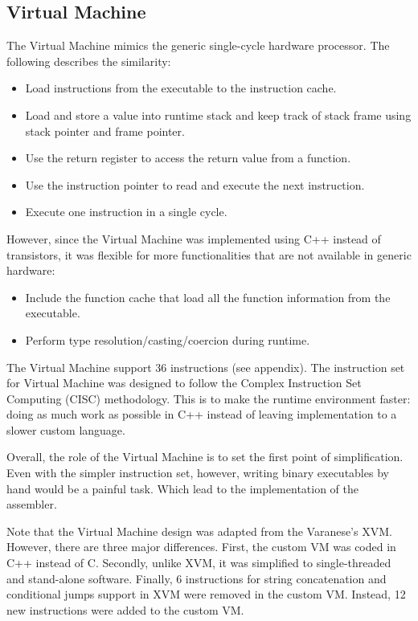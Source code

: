 \documentclass[manuscript,screen,nonacm]{acmart}
\begin{document}
\subsection{Virtual Machine}
The Virtual Machine mimics the generic single-cycle hardware processor. The following describes the similarity:
\begin{itemize}
    \item Load instructions from the executable to the instruction cache. 
    \item Load and store a value into runtime stack and keep track of stack frame using stack pointer and frame pointer.
    \item Use the return register to access the return value from a function.
    \item Use the instruction pointer to read and execute the next instruction.
    \item Execute one instruction in a single cycle.
\end{itemize}
However, since the Virtual Machine was implemented using C++ instead of transistors, it was flexible for more functionalities that are not available in generic hardware:
\begin{itemize}
    \item Include the function cache that load all the function information from the executable.
    \item Perform type resolution/casting/coercion during runtime.
\end{itemize}
The Virtual Machine support 36 instructions (see appendix). The instruction set for Virtual Machine was designed to follow the Complex Instruction Set Computing (CISC) methodology. This is to make the runtime environment faster: doing as much work as possible in C++ instead of leaving implementation to a slower custom language.

Overall, the role of the Virtual Machine is to set the first point of simplification. Even with the simpler instruction set, however, writing binary executables by hand would be a painful task. Which lead to the implementation of the assembler.

Note that the Virtual Machine design was adapted from the Varanese's XVM\cite{Varanese}. However, there are three major differences. First, the custom VM was coded in C++ instead of C. Secondly, unlike XVM, it was simplified to single-threaded and stand-alone software. Finally, 6 instructions for string concatenation and conditional jumps support in XVM were removed in the custom VM. Instead, 12 new instructions were added to the custom VM. 
\end{document}
